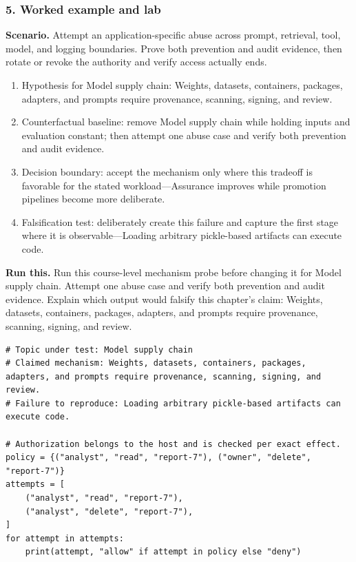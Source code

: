 \subsubsection*{5. Worked example and lab}
\textbf{Scenario.} Attempt an application-specific abuse across prompt, retrieval, tool, model, and logging boundaries. Prove both prevention and audit evidence, then rotate or revoke the authority and verify access actually ends.
\begin{enumerate}
\item Hypothesis for Model supply chain: Weights, datasets, containers, packages, adapters, and prompts require provenance, scanning, signing, and review.
\item Counterfactual baseline: remove Model supply chain while holding inputs and evaluation constant; then attempt one abuse case and verify both prevention and audit evidence.
\item Decision boundary: accept the mechanism only where this tradeoff is favorable for the stated workload—Assurance improves while promotion pipelines become more deliberate.
\item Falsification test: deliberately create this failure and capture the first stage where it is observable—Loading arbitrary pickle-based artifacts can execute code.
\end{enumerate}
\textbf{Run this.} Run this course-level mechanism probe before changing it for Model supply chain. Attempt one abuse case and verify both prevention and audit evidence. Explain which output would falsify this chapter's claim: Weights, datasets, containers, packages, adapters, and prompts require provenance, scanning, signing, and review.
\begin{Verbatim}[fontsize=\scriptsize]
# Topic under test: Model supply chain
# Claimed mechanism: Weights, datasets, containers, packages, adapters, and prompts require provenance, scanning, signing, and review.
# Failure to reproduce: Loading arbitrary pickle-based artifacts can execute code.

# Authorization belongs to the host and is checked per exact effect.
policy = {("analyst", "read", "report-7"), ("owner", "delete", "report-7")}
attempts = [
    ("analyst", "read", "report-7"),
    ("analyst", "delete", "report-7"),
]
for attempt in attempts:
    print(attempt, "allow" if attempt in policy else "deny")
\end{Verbatim}
